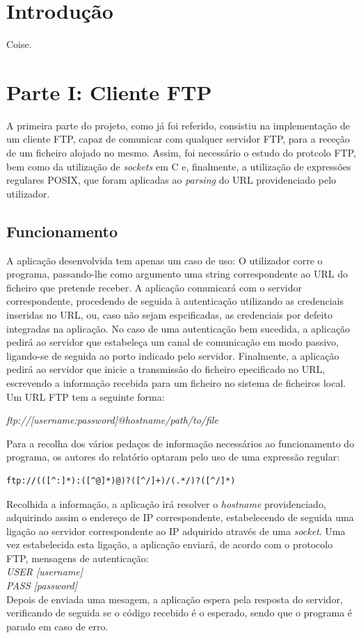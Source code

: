 \documentclass{article}
\begin{document}
\newpage
\section{Introdução}
Coise.


\section{Parte I: Cliente FTP}

A primeira parte do projeto, como já foi referido, consistiu na implementação de um cliente FTP, capaz de comunicar com qualquer servidor FTP, para a receção de um ficheiro alojado no mesmo. Assim, foi necessário o estudo do protcolo FTP, bem como da utilização de \textit{sockets} em C e, finalmente, a utilização de expressões regulares POSIX, que foram aplicadas ao \textit{parsing} do URL providenciado pelo utilizador.

\subsection{Funcionamento}

A aplicação desenvolvida tem apenas um caso de uso: O utilizador corre o programa, passando-lhe como argumento uma string correspondente ao URL do ficheiro que pretende receber. A aplicação comunicará com o servidor correspondente, procedendo de seguida à autenticação utilizando as credenciais inseridas no URL, ou, caso não sejam espcificadas, as credenciais por defeito integradas na aplicação. No caso de uma autenticação bem sucedida, a aplicação pedirá ao servidor que estabeleça um canal de comunicação em modo passivo, ligando-se de seguida ao porto indicado pelo servidor. Finalmente, a aplicação pedirá ao servidor que inicie a transmissão do ficheiro epecificado no URL, escrevendo a informação recebida para um ficheiro no sistema de ficheiros local.
Um URL FTP tem a seguinte forma:

\textit{ftp://[username:password]@hostname/path/to/file}

Para a recolha dos vários pedaços de informação necessários ao funcionamento do programa, os autores do relatório optaram pelo uso de uma expressão regular:

\begin{verbatim}
ftp://(([^:]*):([^@]*)@)?([^/]+)/(.*/)?([^/]*)
\end{verbatim}

Recolhida a informação, a aplicação irá resolver o \textit{hostname} providenciado, adquirindo assim o endereço de IP correspondente, estabelecendo de seguida uma ligação ao servidor correspondente ao IP adquirido através de uma \textit{socket}. Uma vez estabelecida esta ligação, a aplicação enviará, de acordo com o protocolo FTP, mensagens de autenticação:
\\
\textit{USER [username]}\\
\textit{PASS [password]}
\\
Depois de enviada uma mesagem, a aplicação espera pela resposta do servidor, verificando de seguida se o código recebido é o esperado, sendo que o programa é parado em caso de erro.
\end{document}
